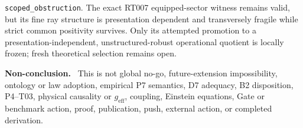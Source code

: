 \documentclass[11pt]{article}
\newenvironment{nonconclusion}{\par\smallskip\noindent\textbf{Non-conclusion.}\ }{\par\smallskip}
\begin{document}
\begingroup\small
\texttt{scoped\_obstruction}.  The exact RT007 equipped-sector witness remains
valid, but its fine ray structure is presentation dependent and transversely
fragile while strict common positivity survives.  Only its attempted promotion
to a presentation-independent, unstructured-robust operational quotient is
locally frozen; fresh theoretical selection remains open.

\begin{nonconclusion}
This is not global no-go, future-extension impossibility, ontology or law
adoption, empirical P7 semantics, D7 adequacy, B2 disposition, P4--T03,
physical causality or $g_{\mathrm{eff}}$, coupling, Einstein equations, Gate or
benchmark action, proof, publication, push, external action, or completed
derivation.
\end{nonconclusion}
\endgroup
\end{document}
